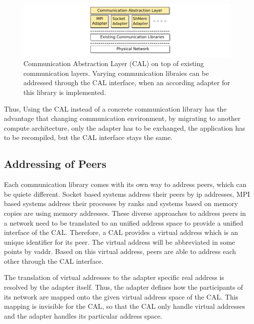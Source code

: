 \begin{figure}[H]
  \centering
  \includegraphics[width=\textwidth]{graphics/30_design_cal}
  \caption{Communication Abstraction Layer (CAL) on top of existing
    communication layers. Varying communication libraies can be
    addressed through the CAL interface, when an according adapter for
    this library is implemented.}
  \label{fig:cal}
\end{figure}

Thus, Using the CAL instead of a concrete communication library has
the advantage that changing communication environment, by migrating to
another compute architecture, only the adapter has to be exchanged,
the application has to be recompiled, but the CAL interface stays the
same.


\subsection{Addressing of Peers}
Each communication library comes with its own way to address peers,
which can be quiete different. Socket based systems address their
peers by ip addresses, MPI based systems address their processes by
ranks and systems based on memory copies are using memory addresses.
These diverse approaches to address peers in a network need to be
translated to an unified address space to provide a unified interface of the CAL.
Therefore, a CAL provides a virtual address which is an unique
identifier for its peer. The virtual address
will be abbreviated in some points by vaddr. Based on this virtual
address, peers are able to address each other through the CAL
interface.

The translation of virtual addresses to the adapter specific real address
is resolved by the adapter itself. Thus, the adapter defines how the participants
of its network are mapped onto the given virtual address space of the CAL. This
mapping is invisible for the CAL, so that the CAL only handle virtual addresses
and the adapter handles its particular address space.


